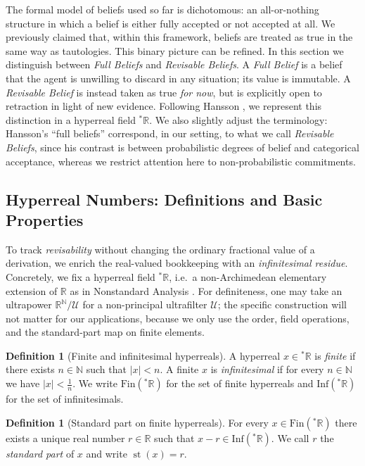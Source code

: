 \documentclass[12pt,a4paper,reqno]{amsart}
\theoremstyle{definition}
\newtheorem{definition}[theorem]{Definition}
\newcommand{\numberset}{\mathbb}
\newcommand{\N}{\numberset{N}}
\newcommand{\R}{\numberset{R}}
\DeclareMathOperator{\st}{st}
\newcommand{\Rstar}{{}^{\ast}\R}
\newcommand{\Fin}{\mathrm{Fin}}
\newcommand{\Inf}{\mathrm{Inf}}
\begin{document}
The formal model of beliefs used so far is dichotomous: an all-or-nothing
structure in which a belief is either fully accepted or not accepted at all.
We previously claimed that, within this framework, beliefs are treated as
true in the same way as tautologies. This binary picture can be refined.
In this section we distinguish between \emph{Full Beliefs} and \emph{Revisable
Beliefs}. A \emph{Full Belief} is a belief that the agent is unwilling to
discard in any situation; its value is immutable. A \emph{Revisable Belief}
is instead taken as true \emph{for now}, but is explicitly open to retraction
in light of new evidence. Following Hansson \cite{Hansson2020}, we represent this distinction in a hyperreal field $\Rstar$.
We also slightly adjust the terminology: Hansson's ``full beliefs'' correspond, in our setting, to what we call \emph{Revisable Beliefs},
since his contrast is between probabilistic degrees of belief and categorical acceptance, whereas we restrict attention here to non-probabilistic commitments.


\subsection{Hyperreal Numbers: Definitions and Basic Properties}
\label{subsec:hyperreal-defs}

To track \emph{revisability} without changing the ordinary fractional value of a derivation, we enrich the real-valued bookkeeping with an \emph{infinitesimal residue}.  Concretely, we fix a hyperreal field $\Rstar$, i.e.\ a non-Archimedean elementary extension of $\R$ as in Nonstandard Analysis \cite{robinson1966,goldblatt1998}.  For definiteness, one may take an ultrapower $\R^\N/\mathcal{U}$ for a non-principal ultrafilter $\mathcal{U}$; the specific construction will not matter for our applications, because we only use the order, field operations, and the standard-part map on finite elements.

\begin{definition}[Finite and infinitesimal hyperreals]\label{def:hyperreal-finite-inf}
A hyperreal $x\in\Rstar$ is \emph{finite} if there exists $n\in\N$ such that $|x|<n$.
A finite $x$ is \emph{infinitesimal} if for every $n\in\N$ we have $|x|<\tfrac{1}{n}$.
We write $\Fin(\Rstar)$ for the set of finite hyperreals and $\Inf(\Rstar)$ for the set of infinitesimals.
\end{definition}

\begin{definition}[Standard part on finite hyperreals]\label{def:standard-part}
For every $x\in\Fin(\Rstar)$ there exists a unique real number $r\in\R$ such that $x-r\in\Inf(\Rstar)$.
We call $r$ the \emph{standard part} of $x$ and write $\st(x)=r$.
\end{definition}
\end{document}
